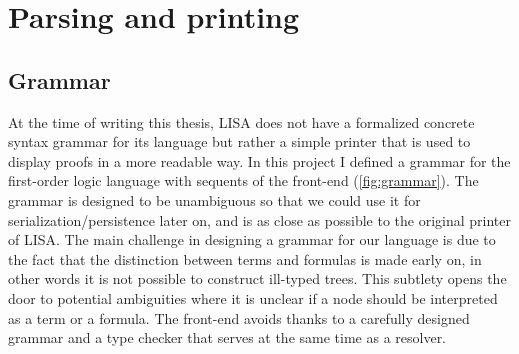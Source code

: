 \section{Parsing and printing}
\label{sec:parsing-printing}

\subsection{Grammar}

At the time of writing this thesis, LISA does not have a formalized concrete syntax grammar for its language but rather a simple printer that is used to display proofs in a more readable way. In this project I defined a grammar for the first-order logic language with sequents of the front-end (\autoref{fig:grammar}). The grammar is designed to be unambiguous so that we could use it for serialization/persistence later on, and is as close as possible to the original printer of LISA. The main challenge in designing a grammar for our language is due to the fact that the distinction between terms and formulas is made early on, in other words it is not possible to construct ill-typed trees. This subtlety opens the door to potential ambiguities where it is unclear if a node should be interpreted as a term or a formula. The front-end avoids thanks to a carefully designed grammar and a type checker that serves at the same time as a resolver.

